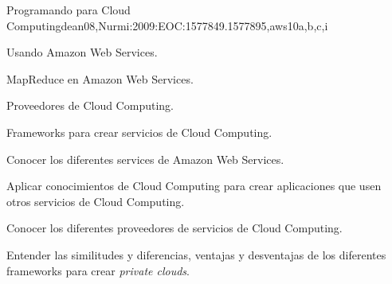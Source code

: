 \begin{syllabus}
\begin{unit}{Programando para Cloud Computing}{dean08,Nurmi:2009:EOC:1577849.1577895,aws}{10}{a,b,c,i}
   \begin{topics}
      \item Usando Amazon Web Services.
      \item MapReduce en Amazon Web Services.
      \item Proveedores de Cloud Computing.
      \item Frameworks para crear servicios de Cloud Computing.
   \end{topics}

   \begin{unitgoals}
      \item Conocer los diferentes services de Amazon Web Services.
      \item Aplicar conocimientos de Cloud Computing para crear aplicaciones que usen otros servicios de Cloud Computing.
      \item Conocer los diferentes proveedores de servicios de Cloud Computing.
      \item Entender las similitudes y diferencias, ventajas y desventajas de los diferentes frameworks para crear \textit{private clouds}.
   \end{unitgoals}
\end{unit}



\begin{coursebibliography}
\end{coursebibliography}

\end{syllabus}
